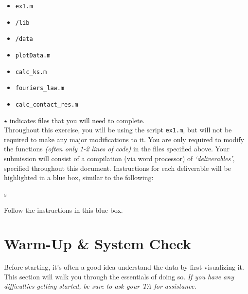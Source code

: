 \documentclass[11pt, letterpaper]{article}
\begin{document}
\begin{itemize}
\renewcommand\labelitemi{-- }
   \item \texttt{ex1.m}
    \item \texttt{/lib}
   \item \texttt{/data}
\renewcommand\labelitemi{[$\star$]}
    \item \texttt{plotData.m}
    \item \texttt{calc\_ks.m}
    \item \texttt{fouriers\_law.m} 
    \item \texttt{calc\_contact\_res.m} 
\end{itemize}

\noindent
$\star$ indicates files that you will need to complete.\\

\n
Throughout this exercise, you will be using the script \texttt{ex1.m}, but will not be required to make any major modifications to it. You are only required to modify the functions \textit{(often only 1-2 lines of code)} in the files specified above. Your submission will consist of a compilation (via word processor) of \textit{`deliverables'}, specified throughout this document. Instructions for each deliverable will be highlighted in a blue box, similar to the following: 
\setcounter{deliv}{-1}
\begin{formal}
    \begin{deliv} s
    
Follow the instructions in this blue box.
    \end{deliv}
\end{formal}


\setcounter{section}{-1}
\section{Warm-Up \& System Check}

Before starting, it's often a good idea understand the data by first visualizing it. This section will walk you through the essentials of doing so. \textit{If you have any difficulties getting started, be sure to ask your TA for assistance.} \n
\end{document}
